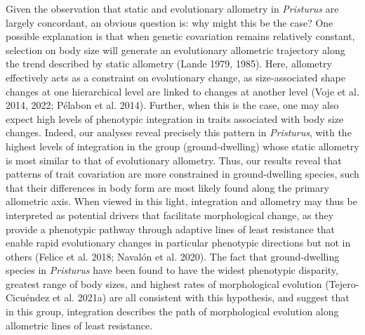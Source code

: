 \documentclass[
  11pt,
]{article}
\begin{document}
Given the observation that static and evolutionary allometry in
\emph{Pristurus} are largely concordant, an obvious question is: why
might this be the case? One possible explanation is that when genetic
covariation remains relatively constant, selection on body size will
generate an evolutionary allometric trajectory along the trend described
by static allometry (Lande 1979, 1985). Here, allometry effectively acts
as a constraint on evolutionary change, as size-associated shape changes
at one hierarchical level are linked to changes at another level (Voje
et al. 2014, 2022; Pélabon et al. 2014). Further, when this is the case,
one may also expect high levels of phenotypic integration in traits
associated with body size changes. Indeed, our analyses reveal precisely
this pattern in \emph{Pristurus}, with the highest levels of integration
in the group (ground-dwelling) whose static allometry is most similar to
that of evolutionary allometry. Thus, our results reveal that patterns
of trait covariation are more constrained in ground-dwelling species,
such that their differences in body form are most likely found along the
primary allometric axis. When viewed in this light, integration and
allometry may thus be interpreted as potential drivers that facilitate
morphological change, as they provide a phenotypic pathway through
adaptive lines of least resistance that enable rapid evolutionary
changes in particular phenotypic directions but not in others (Felice et
al. 2018; Navalón et al. 2020). The fact that ground-dwelling species in
\emph{Pristurus} have been found to have the widest phenotypic
disparity, greatest range of body sizes, and highest rates of
morphological evolution (Tejero-Cicuéndez et al. 2021a) are all
consistent with this hypothesis, and suggest that in this group,
integration describes the path of morphological evolution along
allometric lines of least resistance. \hfill\break
\end{document}
